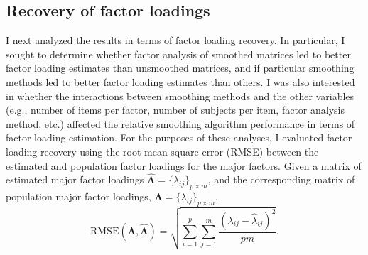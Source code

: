 \documentclass[
  english,
  man]{apa6}
\begin{document}
\hypertarget{recovery-of-factor-loadings}{%
\subsection{Recovery of factor loadings}\label{recovery-of-factor-loadings}}

I next analyzed the results in terms of factor loading recovery. In particular, I sought to determine whether factor analysis of smoothed matrices led to better factor loading estimates than unsmoothed matrices, and if particular smoothing methods led to better factor loading estimates than others. I was also interested in whether the interactions between smoothing methods and the other variables (e.g., number of items per factor, number of subjects per item, factor analysis method, etc.) affected the relative smoothing algorithm performance in terms of factor loading estimation. For the purposes of these analyses, I evaluated factor loading recovery using the root-mean-square error (RMSE) between the estimated and population factor loadings for the major factors. Given a matrix of estimated major factor loadings \(\hat{\mathbf{\Lambda}} = \{ \hat{\lambda}_{ij} \}_{p \times m}\), and the corresponding matrix of population major factor loadings, \(\mathbf{\Lambda} = \{ \lambda_{ij} \}_{p \times m}\),
\begin{equation}
\textrm{RMSE}(\mathbf{\Lambda}, \hat{\mathbf{\Lambda}}) = \sqrt{\sum_{i = 1}^{p} \sum_{j = 1}^{m} \frac{(\lambda_{ij} - \hat{\lambda}_{ij})^2}{pm}}.
\label{eq:rmse}
\end{equation}
\end{document}
